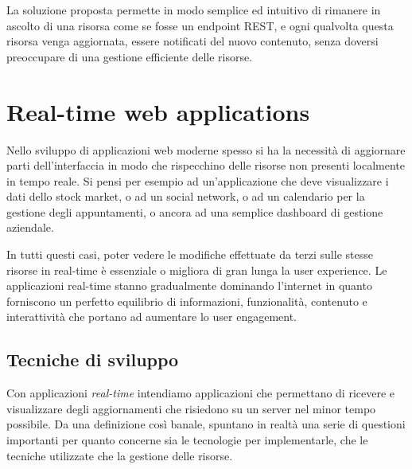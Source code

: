 \documentclass[12pt,a4paper,openright,twoside]{report}
\begin{document}
\bigskip

La soluzione proposta permette in modo semplice ed intuitivo di rimanere in ascolto di una risorsa come se fosse un endpoint REST, e ogni qualvolta questa risorsa venga aggiornata, essere notificati del nuovo contenuto, senza doversi preoccupare di una gestione efficiente delle risorse.

\chapter{Real-time web applications}
\pagestyle{fancy}
\lhead[\rmfamily\thepage]{\fancyplain{}{\itshape\nouppercase\rightmark}} %
\rhead[\fancyplain{}{\itshape\nouppercase\leftmark}]{\rmfamily\thepage} %

Nello sviluppo di applicazioni web moderne spesso si ha la necessità di aggiornare parti dell’interfaccia in modo che rispecchino delle risorse non presenti localmente in tempo reale. Si pensi per esempio ad un’applicazione che deve visualizzare i dati dello stock market, o ad un social network, o ad un calendario per la gestione degli appuntamenti, o ancora ad una semplice dashboard di gestione aziendale. 

\bigskip

In tutti questi casi, poter vedere le modifiche effettuate da terzi sulle stesse risorse in real-time è essenziale o migliora di gran lunga la user experience. Le applicazioni real-time stanno gradualmente dominando l’internet in quanto forniscono un perfetto equilibrio di informazioni, funzionalità, contenuto e interattività che portano ad aumentare lo user engagement.

\section{Tecniche di sviluppo}

Con applicazioni \textit{real-time} intendiamo applicazioni che permettano di ricevere e visualizzare degli aggiornamenti che risiedono su un server nel minor tempo possibile. Da una definizione così banale, spuntano in realtà una serie di questioni importanti per quanto concerne sia le tecnologie per implementarle, che le tecniche utilizzate che la gestione delle risorse.
\end{document}
